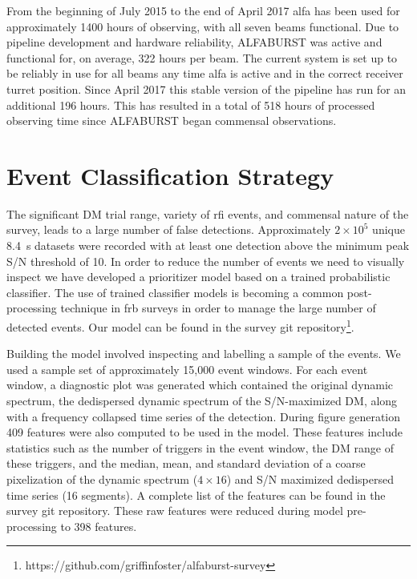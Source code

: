 \documentclass[a4paper,fleqn,usenatbib]{mnras}
\begin{document}
From the beginning of July 2015 to the end of April 2017 \gls{alfa} has been
used for approximately 1400 hours of observing, with all seven beams functional.
Due to pipeline development and hardware reliability, ALFABURST was active and
functional for, on average, 322 hours per beam.  The current system is set up to
be reliably in use for all beams any time \gls{alfa} is active and in the
correct receiver turret position. Since April 2017 this stable version of the
pipeline has run for an additional 196 hours. This has resulted in a total of
518 hours of processed observing time since ALFABURST began commensal observations.



\section{Event Classification Strategy}
\label{sec:event_classify}

The significant DM trial range, variety of \gls{rfi} events, and commensal
nature of the survey, leads to a large number of false detections.
Approximately $2 \times 10^5$ unique 8.4~s datasets were recorded with at least
one detection above the minimum peak S/N threshold of 10. In order to reduce the
number of events we need to visually inspect we have developed a prioritizer
model based on a trained probabilistic classifier. The use of trained
classifier models is becoming a common post-processing technique in \gls{frb}
surveys \citep{2016PASP..128h4503W} in order to manage the large number of
detected events. Our model can be found in the survey git
repository\footnote{https://github.com/griffinfoster/alfaburst-survey}.

Building the model involved inspecting and labelling a sample of the events. We
used a sample set of approximately 15,000 event windows.  For each event window,
a diagnostic plot was generated which contained the original dynamic spectrum,
the dedispersed dynamic spectrum of the S/N-maximized DM, along with a frequency
collapsed time series of the detection.  During figure generation 409 features
were also computed to be used in the model.  These features include statistics
such as the number of triggers in the event window, the DM range of these
triggers, and the median, mean, and standard deviation of a coarse pixelization
of the dynamic spectrum ($4 \times 16$) and S/N maximized dedispersed time
series (16 segments). A complete list of the features can be found in the
survey git repository. These raw features were reduced during model
pre-processing to 398 features.
\end{document}
